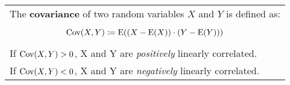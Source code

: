 {\tabulinesep=1mm
\begin{tabu}{|p{16cm} |}
\hline
The \textbf{covariance} of two random variables $X$ and $Y$ is defined as: \\
\[\text{Cov}(X, Y) \coloneqq \text{E} ((X - \text{E}(X)) \cdot (Y - \text{E}(Y)))\] \\
If $\text{Cov}(X, Y) > 0$, X and Y are \textit{positively} linearly correlated. \\
If $\text{Cov}(X, Y) < 0$, X and Y are \textit{negatively} linearly correlated. \\
\hline
\end{tabu}
}